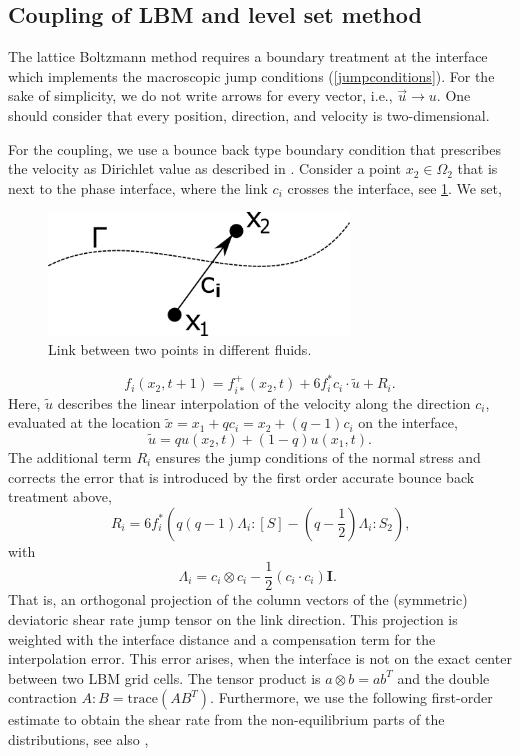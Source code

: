 \documentclass[final,leqno,onefignum,onetabnum]{siamltexmm}
\begin{document}
\subsection{Coupling of LBM and level set method}
The lattice Boltzmann method requires a boundary treatment at the interface which implements the macroscopic jump conditions (\ref{jumpconditions}). For the sake of simplicity, we do not write arrows for every vector, i.e., $\vec{u} \rightarrow u$. One should consider that every position, direction, and velocity is two-dimensional. 

For the coupling, we use a bounce back type boundary condition that prescribes the velocity as Dirichlet value as described in \cite[p. 1146]{Thoemmes}. Consider a point $x_2 \in \Omega_2$ that is next to the phase interface, where the link $c_i$ crosses the interface, see \cref{coupling}. We set,
\begin{figure}[h!]
	\hfill\includegraphics[width=8cm,natwidth=437,natheight=178]{coupling.png}\hspace*{\fill}
	\caption{Link between two points in different fluids.}
	\label{coupling}
\end{figure}
\begin{equation}
	f_i(x_2,t+1) = f_{i*}^+(x_2,t) + 6f_i^*c_i \cdot \tilde{u} + R_i \text{.}
\end{equation}
Here, $\tilde{u}$ describes the linear interpolation of the velocity along the direction $c_i$, evaluated at the location $\tilde{x} = x_1 + qc_i = x_2 + (q-1)c_i$ on the interface,
$$
\tilde{u} = qu(x_2,t) + (1-q)u(x_1,t) \text{.}
$$
The additional term $R_i$ ensures the jump conditions of the normal stress and corrects the error that is introduced by the first order accurate bounce back treatment above,
\begin{equation}
  R_i = 6f_i^* \left(q(q-1)\Lambda_i:[S] - (q-\frac12)\Lambda_i:S_2 \right) \text{,}
  \label{R_i}
\end{equation}
with
\begin{equation}
  \Lambda_i = c_i \otimes c_i - \frac12 (c_i \cdot c_i) \mathbf{I} \text{. }
\end{equation}
That is, an orthogonal projection of the column vectors of the (symmetric) deviatoric shear rate jump tensor on the link direction. This projection is weighted with the interface distance and a compensation term for the interpolation error. This error arises, when the interface is not on the exact center between two LBM grid cells. The tensor product is $a \otimes b = ab^T$ and the double contraction $A:B = \mathrm{trace}(AB^T)$. Furthermore, we use the following first-order estimate to obtain the shear rate from the non-equilibrium parts of the distributions, see also \cite{Krueger},
\end{document}
